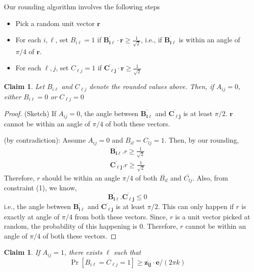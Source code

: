 \documentclass[11pt]{article}
\newtheorem{claim}[lemma]{Claim} %
\begin{document}
Our rounding algorithm involves the following steps
\begin{itemize}
\item
Pick a random unit vector $\mathbf{r}$
\item
For each $i, \ell$, set $B_{i\ell}=1$ if $\overline{\mathbf{B_{i\ell}}}\cdot\mathbf{r} \geq \frac{1}{\sqrt{2}}$, i.e.,
if $\overline{\mathbf{B_{i\ell}}}$ is within an angle of $\pi/4$ of $\mathbf{r}$.
\item
For each $\ell, j$, set $C_{\ell j}=1$ if $\overline{\mathbf{C_{\ell j}}}\cdot\mathbf{r} \geq \frac{1}{\sqrt{2}}$
\end{itemize}

\begin{claim}
\label{claim1}
Let $B_{i\ell}$ and $C_{\ell j}$ denote the rounded values above. Then,
if $A_{ij}=0$, either $B_{i\ell}=0$ or $C_{\ell j}=0$
\end{claim}
\begin{proof} (Sketch)
If $A_{ij}=0$, the angle between $\overline{\mathbf{B_{i\ell}}}$ and
$\overline{\mathbf{C_{\ell j}}}$ is at least $\pi/2$. $\mathbf{r}$ cannot
be within an angle of $\pi/4$ of both these vectors. 

(by contradiction): Assume $A_{ij} = 0$ and $B_{il} = C_{lj} = 1$. 
Then, by our rounding,
\begin{eqnarray}
\overline{\mathbf{B_{i\ell}}}.r \geq \frac{1}{\sqrt{2}}  \\
\overline{\mathbf{C_{\ell j}}}.r \geq \frac{1}{\sqrt{2}} 
\end{eqnarray}
Therefore, $r$ should be within an angle $\pi/4$ of both $\overline{B_{il}}$ and $\overline{C_{lj}}$. 
Also, from constraint (1), we know, 
\begin{equation}
\overline{\mathbf{B_{i\ell}}}.\overline{\mathbf{C_{\ell j}}}\leq 0
\end{equation}
i.e., the angle between $\overline{\mathbf{B_{i\ell}}}$ and $\overline{\mathbf{C_{\ell j}}}$ is at least $\pi/2$. This can only happen if $r$ is exactly at angle of $\pi/4$ from both these vectors. Since, $r$ is a unit vector picked at random, the probability of this happening is 0. Therefore, $r$ cannot be within an angle of $\pi/4$ of both these vectors. 
\end{proof}
\begin{claim}
\label{claim2}
If $A_{ij}=1$, there exists $\ell$ such that
\[
\Pr[B_{i\ell} = C_{\ell j} = 1] \geq \overline{\mathbf{z_{ij}}}\cdot \mathbf{e}/(2\pi k)
\]
\end{claim}
\end{document}
